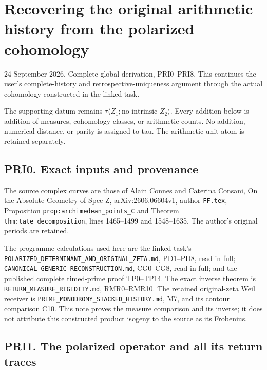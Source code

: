 \documentclass[
]{article}
\begin{document}
\section{Recovering the original arithmetic history from the polarized
cohomology}\label{recovering-the-original-arithmetic-history-from-the-polarized-cohomology}

24 September 2026. Complete global derivation, PRI0--PRI8. This
continues the user's complete-history and retrospective-uniqueness
argument through the actual cohomology constructed in the linked task.

The supporting datum remains
\(\tau\langle Z_1;\text{no intrinsic }Z_2\rangle\). Every addition below
is addition of measures, cohomology classes, or arithmetic counts. No
addition, numerical distance, or parity is assigned to tau. The
arithmetic unit atom is retained separately.

\subsection{PRI0. Exact inputs and
provenance}\label{pri0.-exact-inputs-and-provenance}

The source complex curves are those of Alain Connes and Caterina
Consani, \href{https://arxiv.org/abs/2606.06604v1}{On the Absolute
Geometry of Spec Z, arXiv:2606.06604v1}, author \texttt{FF.tex},
Proposition \texttt{prop:archimedean\_points\_C} and Theorem
\texttt{thm:tate\_decomposition}, lines 1465--1499 and 1548--1635. The
author's original periods are retained.

The programme calculations used here are the linked task's
\nolinkurl{POLARIZED_DETERMINANT_AND_ORIGINAL_ZETA.md}, PD1--PD8, read
in full; \nolinkurl{CANONICAL_GENERIC_RECONSTRUCTION.md}, CG0--CG8, read
in full; and the
\href{https://github.com/KokunoYumeto/zeta-function-research-reader/blob/32acd0df89ae22c96d2bc30372e4426a31ce4506/workbenches/splitzero-tandem/temporary-arguments/20260924-fixed-generic-point-purity/timed-prime-reconstruction/README.md}{published
complete timed-prime proof TP0--TP14}. The exact inverse theorem is
\texttt{RETURN\_MEASURE\_RIGIDITY.md}, RMR0--RMR10. The retained
original-zeta Weil receiver is
\nolinkurl{PRIME_MONODROMY_STACKED_HISTORY.md}, M7, and its contour
comparison C10. This note proves the measure comparison and its inverse;
it does not attribute this constructed product isogeny to the source as
its Frobenius.

\subsection{PRI1. The polarized operator and all its return
traces}\label{pri1.-the-polarized-operator-and-all-its-return-traces}
\end{document}
